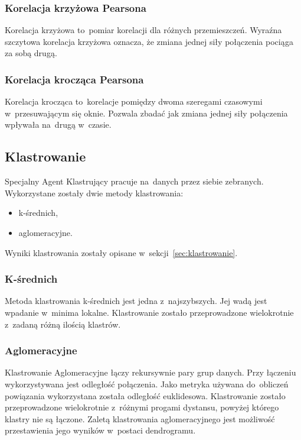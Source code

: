 \documentclass[11pt]{report}
\begin{document}
    \subsubsection{Korelacja krzyżowa Pearsona}
    Korelacja krzyżowa to~pomiar korelacji dla różnych przemieszczeń.
    Wyraźna szczytowa korelacja krzyżowa oznacza, że zmiana jednej siły połączenia pociąga za sobą drugą.

    \subsubsection{Korelacja krocząca Pearsona}
    Korelacja krocząca to~korelacje pomiędzy dwoma szeregami czasowymi w~przesuwającym się oknie.
    Pozwala zbadać jak zmiana jednej siły połączenia wpływała na~drugą w~czasie.

    \subsection{Klastrowanie}

    Specjalny Agent Klastrujący pracuje na~danych przez siebie zebranych.
    Wykorzystane zostały dwie metody klastrowania:
    \begin{itemize}
        \item k-średnich,
        \item aglomeracyjne.
    \end{itemize}

    Wyniki klastrowania zostały opisane w~sekcji~\ref{sec:klastrowanie}.

    \subsubsection{K-średnich}
    Metoda klastrowania k-średnich jest jedna z~najszybszych.
    Jej wadą jest wpadanie w~minima lokalne.
    Klastrowanie zostało przeprowadzone wielokrotnie z~zadaną różną ilością klastrów.


    \subsubsection{Aglomeracyjne}
    Klastrowanie Aglomeracyjne łączy rekursywnie pary grup danych.
    Przy łączeniu wykorzystywana jest odległość połączenia.
    Jako metryka używana do~obliczeń powiązania wykorzystana została odległość euklidesowa.
    Klastrowanie zostało przeprowadzone wielokrotnie z~różnymi progami dystansu, powyżej którego klastry nie są łączone.
    Zaletą klastrowania aglomeracyjnego jest możliwość przestawienia jego wyników w~postaci dendrogramu.
\end{document}
